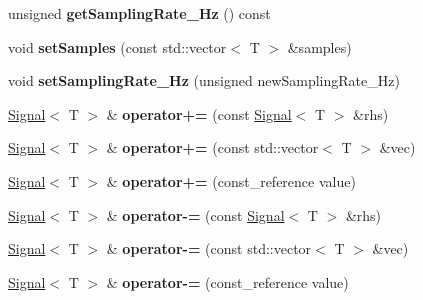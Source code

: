 \begin{DoxyCompactItemize}
unsigned {\bfseries get\+Sampling\+Rate\+\_\+\+Hz} () const
\item 
\mbox{\label{classdsp_1_1_signal_acd40c89b8159982923cf19b61ab41000}} 
void {\bfseries set\+Samples} (const std\+::vector$<$ T $>$ \&samples)
\item 
\mbox{\label{classdsp_1_1_signal_a6d5be5ac24152da55721a22d96ec54b3}} 
void {\bfseries set\+Sampling\+Rate\+\_\+\+Hz} (unsigned new\+Sampling\+Rate\+\_\+\+Hz)
\item 
\mbox{\label{classdsp_1_1_signal_a29c66425e845bdd13c6b6af4c325be22}} 
\mbox{\hyperlink{classdsp_1_1_signal}{Signal}}$<$ T $>$ \& {\bfseries operator+=} (const \mbox{\hyperlink{classdsp_1_1_signal}{Signal}}$<$ T $>$ \&rhs)
\item 
\mbox{\label{classdsp_1_1_signal_aa2934d472ab782f5f6b6eb733d8ad42d}} 
\mbox{\hyperlink{classdsp_1_1_signal}{Signal}}$<$ T $>$ \& {\bfseries operator+=} (const std\+::vector$<$ T $>$ \&vec)
\item 
\mbox{\label{classdsp_1_1_signal_a6b36c68fd8f7181ab3e602e255dd4720}} 
\mbox{\hyperlink{classdsp_1_1_signal}{Signal}}$<$ T $>$ \& {\bfseries operator+=} (const\+\_\+reference value)
\item 
\mbox{\label{classdsp_1_1_signal_a3ce1de007c7d0ccf6705734c76bc2aa4}} 
\mbox{\hyperlink{classdsp_1_1_signal}{Signal}}$<$ T $>$ \& {\bfseries operator-\/=} (const \mbox{\hyperlink{classdsp_1_1_signal}{Signal}}$<$ T $>$ \&rhs)
\item 
\mbox{\label{classdsp_1_1_signal_a850e8f72aefb713c895ed07e6d89641a}} 
\mbox{\hyperlink{classdsp_1_1_signal}{Signal}}$<$ T $>$ \& {\bfseries operator-\/=} (const std\+::vector$<$ T $>$ \&vec)
\item 
\mbox{\label{classdsp_1_1_signal_a8af7455c27ebb6cf34a1cbc897a129a2}} 
\mbox{\hyperlink{classdsp_1_1_signal}{Signal}}$<$ T $>$ \& {\bfseries operator-\/=} (const\+\_\+reference value)
\item 
\mbox{\label{classdsp_1_1_signal_a61d647766020f2d470508f2a2c3f0403}} 

\end{DoxyCompactItemize}
